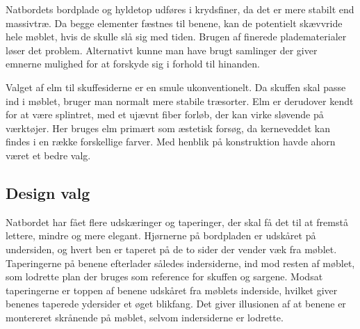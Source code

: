 Natbordets bordplade og hyldetop udføres i krydsfiner, da det er mere stabilt
end massivtræ. Da begge elementer fæstnes til benene, kan de potentielt
skævvride hele møblet, hvis de skulle slå sig med tiden. Brugen af finerede
pladematerialer løser det problem. Alternativt kunne man have brugt samlinger
der giver emnerne mulighed for at forskyde sig i forhold til hinanden.

Valget af elm til skuffesiderne er en smule ukonventionelt. Da skuffen skal
passe ind i møblet, bruger man normalt mere stabile træsorter.
Elm er derudover kendt for at være splintret, med et ujævnt fiber forløb, der kan
virke sløvende på værktøjer. Her bruges elm primært som æstetisk forsøg, da
kerneveddet kan findes i en række forskellige farver. Med henblik på
konstruktion havde ahorn været et bedre valg.

\subsection*{Design valg}
Natbordet har fået flere udskæringer og taperinger, der skal få det til at
fremstå lettere, mindre og mere elegant. Hjørnerne på bordpladen er udskåret på
undersiden, og hvert ben er taperet på de to sider der vender væk fra møblet.
Taperingerne på benene efterlader således indersiderne, ind mod resten af
møblet, som lodrette plan der bruges som reference for skuffen og sargene.
Modsat taperingerne er toppen af benene udskåret fra møblets inderside, hvilket
giver benenes taperede ydersider et øget blikfang. Det giver illusionen af at
benene er montereret skrånende på møblet, selvom indersiderne
er lodrette.
